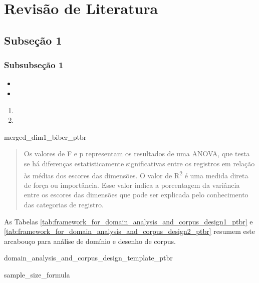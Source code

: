 \section{Revisão de Literatura}

\lipsum[1]

\subsection{Subseção 1}

\lipsum[1]

\subsubsection{Subsubseção 1}

\lipsum[1]

\begin{itemize}
    \item
    \item
\end{itemize}

\lipsum[1]

\begin{enumerate}
    \item
    \item
\end{enumerate}

\lipsum[1]

{merged_dim1_biber_ptbr}

\begin{quote}
    \small Os valores de F e p representam os resultados de uma ANOVA, que testa se há diferenças estatisticamente significativas entre os registros em relação às médias dos escores das dimensões. O valor de R\textsuperscript{2} é uma medida direta de força ou importância. Esse valor indica a porcentagem da variância entre os escores das dimensões que pode ser explicada pelo conhecimento das categorias de registro. \cite[p.~834, tradução nossa]{biberMultidimensionalApproaches2009}
\end{quote}

\lipsum[1]

As Tabelas \ref{tab:framework_for_domain_analysis_and_corpus_design1_ptbr} e \ref{tab:framework_for_domain_analysis_and_corpus_design2_ptbr} resumem este arcabouço para análise de domínio e desenho de corpus.

\begin{landscape}
    {\footnotesize {domain_analysis_and_corpus_design_template_ptbr}}
\end{landscape}

\lipsum[1]

{sample_size_formula}

\lipsum[1]
